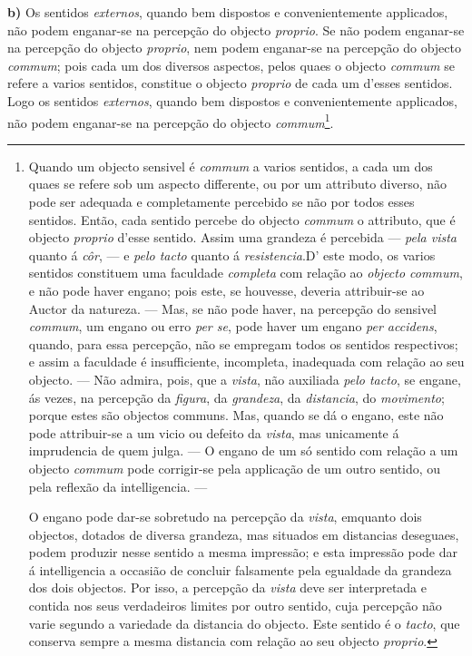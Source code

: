 \textbf{b)} Os sentidos \emph{externos}, quando bem dispostos e convenientemente applicados, não podem enganar-se na percepção do objecto \emph{proprio}. Se não podem enganar-se na percepção do objecto \emph{proprio}, nem podem enganar-se na percepção do objecto \emph{commum}; pois cada um dos diversos aspectos, pelos quaes o objecto \emph{commum} se refere a varios sentidos, constitue o objecto \emph{proprio} de cada um d'esses sentidos. Logo os sentidos \emph{externos}, quando bem dispostos e convenientemente applicados, não podem enganar-se na percepção do objecto \emph{commum}\footnote{Quando um objecto sensivel é \emph{commum} a varios sentidos, a cada um dos quaes se refere sob um aspecto differente, ou por um attributo diverso, não pode ser adequada e completamente percebido se não por todos esses sentidos. Então, cada sentido percebe do objecto \emph{commum} o attributo, que é objecto \emph{proprio} d'esse sentido. Assim uma grandeza é percebida --- \emph{pela vista} quanto á \emph{côr}, --- e \emph{pelo tacto} quanto á \emph{resistencia}.D' este modo, os varios sentidos constituem uma faculdade \emph{completa} com relação ao \emph{objecto commum}, e não pode haver engano; pois este, se houvesse, deveria attribuir-se ao Auctor da natureza. --- Mas, se não pode haver, na percepção do sensivel \emph{commum}, um engano ou erro \emph{per se}, pode haver um engano \emph{per accidens}, quando, para essa percepção, não se empregam todos os sentidos respectivos; e assim a faculdade é insufficiente, incompleta, inadequada com relação ao seu objecto. --- Não admira, pois, que a \emph{vista}, não auxiliada \emph{pelo tacto}, se engane, ás vezes, na percepção da \emph{figura}, da \emph{grandeza}, da \emph{distancia}, do \emph{movimento}; porque estes são objectos communs. Mas, quando se dá o engano, este não pode attribuir-se a um vicio ou defeito da \emph{vista}, mas unicamente á imprudencia de quem julga. --- O engano de um só sentido com relação a um objecto \emph{commum} pode corrigir-se pela applicação de um outro sentido, ou pela reflexão da intelligencia. ---\par O engano pode dar-se sobretudo na percepção da \emph{vista}, emquanto dois objectos, dotados de diversa grandeza, mas situados em distancias deseguaes, podem produzir nesse sentido a mesma impressão; e esta impressão pode dar á intelligencia a occasião de concluir falsamente pela egualdade da grandeza dos dois objectos. Por isso, a percepção da \emph{vista} deve ser interpretada e contida nos seus verdadeiros limites por outro sentido, cuja percepção não varie segundo a variedade da distancia do objecto. Este sentido é o \emph{tacto}, que conserva sempre a mesma distancia com relação ao seu objecto \emph{proprio}.}.

